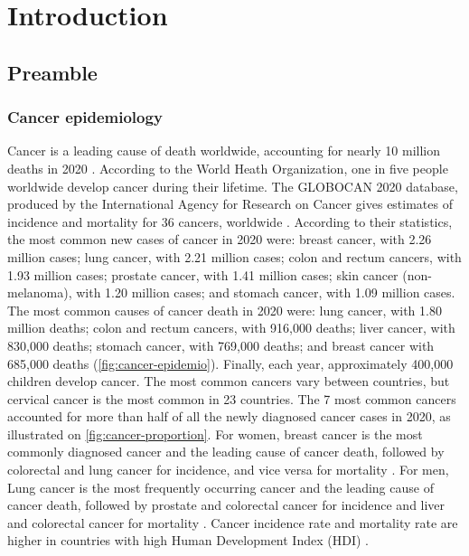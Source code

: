 \chapter{Introduction}

\section{Preamble}

\subsection{Cancer epidemiology}

Cancer is a leading cause of death worldwide, accounting for nearly 10 million
deaths in 2020 \cite{ferlay_cancer_2021}. According to the World Heath
Organization, one in five people worldwide develop cancer during their lifetime.
The GLOBOCAN 2020 database, produced by the International Agency for Research on
Cancer gives estimates of incidence and mortality for 36 cancers, worldwide
\cite{sung_global_2021}. According to their statistics, the most common new
cases of cancer in 2020 were: breast cancer, with 2.26 million cases; lung
cancer, with 2.21 million cases; colon and rectum cancers, with 1.93 million
cases; prostate cancer, with 1.41 million cases; skin cancer (non-melanoma),
with 1.20 million cases; and stomach cancer, with 1.09 million cases. The most
common causes of cancer death in 2020 were: lung cancer, with 1.80 million
deaths; colon and rectum cancers, with 916,000 deaths; liver cancer, with
830,000 deaths; stomach cancer, with 769,000 deaths; and breast cancer with
685,000 deaths (\cref{fig:cancer-epidemio}). Finally, each year, approximately
400,000 children develop cancer. The most common cancers vary between countries,
but cervical cancer is the most common in 23 countries. The 7 most common
cancers accounted for more than half of all the newly diagnosed cancer cases in
2020, as illustrated on \cref{fig:cancer-proportion}. For women, breast cancer
is the most commonly diagnosed cancer and the leading cause of cancer death,
followed by colorectal and lung cancer for incidence, and vice versa for
mortality \cite{sung_global_2021}. For men, Lung cancer is the most frequently
occurring cancer and the leading cause of cancer death, followed by prostate and
colorectal cancer for incidence and liver and colorectal cancer for mortality
\cite{sung_global_2021}. Cancer incidence rate and mortality rate are higher in
countries with high Human Development Index (HDI) \cite{sung_global_2021}.

